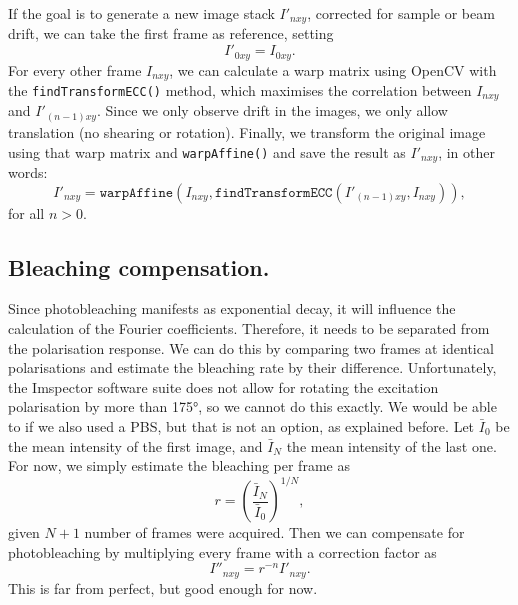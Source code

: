 If the goal is to generate a new image stack $ I'_{nxy} $, corrected for sample or beam drift, we can take the first frame as reference, setting 
\begin{equation}
	I'_{0xy} = I_{0xy}.
\end{equation}
For every other frame $ I_{nxy} $, we can calculate a warp matrix using OpenCV with the \texttt{findTransformECC()} method, which maximises the correlation between $ I_{nxy} $ and $ I'_{(n-1)xy} $. Since we only observe drift in the images, we only allow translation (no shearing or rotation). Finally, we transform the original image using that warp matrix and \texttt{warpAffine()} and save the result as $ I'_{nxy} $, in other words:
\begin{equation}
	I'_{nxy} = \texttt{warpAffine}\left(
		I_{nxy}, 
		\texttt{findTransformECC}\left(I'_{(n-1)xy}, I_{nxy}\right)
	\right),
\end{equation}
for all $ n>0 $.

\subsection{Bleaching compensation.} Since photobleaching manifests as exponential decay, it will influence the calculation of the Fourier coefficients. Therefore, it needs to be separated from the polarisation response. We can do this by comparing two frames at identical polarisations and estimate the bleaching rate by their difference. Unfortunately, the Imspector software suite does not allow for rotating the excitation polarisation by more than \ang{175}, so we cannot do this exactly. We would be able to if we also used a PBS, but that is not an option, as explained before. Let $ \bar{I}_0 $ be the mean intensity of the first image, and $ \bar{I}_N $ the mean intensity of the last one. For now, we simply estimate the bleaching per frame as
\begin{equation}
	r = \left( \frac{\bar{I}_N}{\bar{I}_0} \right) ^{1/N},
\end{equation}
given $ N+1 $ number of frames were acquired. Then we can compensate for photobleaching by multiplying every frame with a correction factor as
\begin{equation}
	I''_{nxy} = r^{-n} I'_{nxy}.
\end{equation}
This is far from perfect, but good enough for now.

